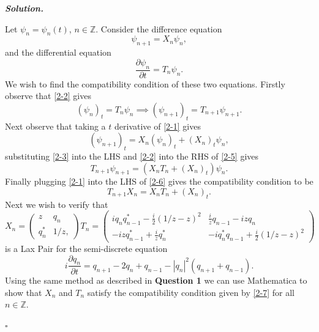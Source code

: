 \documentclass[12pt]{report}
\newenvironment{solution}[1][\it{Solution}]{\textbf{#1. } }{$\square$}
\def\Z{{\mathbb Z}}
\newcommand{\paren}[1]{{\left(#1\right)}} %
\newcommand{\pp}[2]{\frac{\partial #1}{\partial #2}} %
\begin{document}
\begin{solution}
    
    \noindent
    Let $\psi_n=\psi_n(t)$, $n\in \mathbb{Z}$.
    Consider the difference equation
    \begin{equation} \label{2-1}
        \psi_{n+1}=X_n \psi_n,
    \end{equation} 
    and the differential equation
    \begin{equation} \label{2-2}
        \pp{\psi_n}{t}=T_n\psi_n.
    \end{equation}
    We wish to find the compatibility condition of these two equations. Firstly observe that \ref{2-2} gives
    \begin{equation} \label{2-3}
        (\psi_{n})_t = T_n\psi_n \implies (\psi_{n+1})_t = T_{n+1} \psi_{n+1}.
    \end{equation}
    Next observe that taking a $t$ derivative of \ref{2-1} gives
    \begin{equation} \label{2-5}
        (\psi_{n+1})_t = X_n(\psi_n)_t + (X_n)_t\psi_n,
    \end{equation} 
    substituting \ref{2-3} into the LHS and \ref{2-2} into the RHS of \ref{2-5} gives
    \begin{equation} \label{2-6}
        T_{n+1}\psi_{n+1} = \paren{X_nT_n + (X_n)_t}\psi_n.
    \end{equation}    
    Finally plugging \ref{2-1} into the LHS of \ref{2-6} gives the compatibility condition to be
    \begin{equation} \label{2-7}
        T_{n+1}X_n = X_nT_n + (X_{n})_t.
    \end{equation}
    Next we wish to verify that
    \[ 
    X_n=\begin{pmatrix}
        z & q_n\\
        q^*_n & 1/z,
    \end{pmatrix}
    T_n=\begin{pmatrix}
        i q_n q^*_{n-1}-\frac{i}{2}\left(1/z-z\right)^2&
        \frac{i}{z}q_{n-1}-izq_n\\
        -izq^*_{n-1}+\frac{i}{z}q^*_n&
        -i q^*_n q_{n-1}+\frac{i}{2}\left(1/z-z\right)^2
    \end{pmatrix}
    \] 
    is a Lax Pair for the semi-discrete equation
    \[ 
    i \pp{q_n}{t}=q_{n+1}-2q_n+q_{n-1}-|q_n|^2 (q_{n+1}+q_{n-1}).
    \] 
    Using the same method as described in {\bf Question 1} we can use Mathematica to show that $X_n$ and $T_n$ satisfy the compatibility condition given by \ref{2-7} for all $n \in \Z$.


\end{solution}
\end{document}
